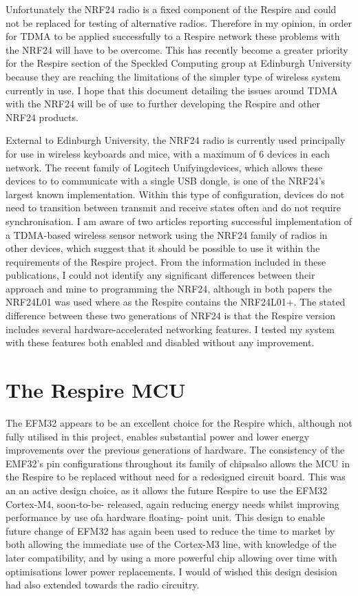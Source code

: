 Unfortunately the \ac{NRF24} radio is a fixed component of the Respire and could
not be replaced for testing of alternative radios. Therefore in my opinion, in order
for \ac{TDMA} to be applied successfully to a Respire network these problems with
the \ac{NRF24} will have to be overcome. This has recently become a greater priority
for the Respire section of the Speckled Computing group at Edinburgh University
because they are reaching the limitations of the simpler type of wireless system
currently in use.  I hope that this document detailing the issues around \ac{TDMA}
with the \ac{NRF24} will be of use to further developing the Respire and other
\ac{NRF24} products.

External to Edinburgh University, the \ac{NRF24} radio is currently used principally for use in wireless
keyboards and mice, with a maximum of 6 devices in each network. The recent family of Logitech
Unifying\textregistered devices, which allows these devices to to communicate with a single \ac{USB}
dongle, is one of the \ac{NRF24}'s largest known implementation. Within this type of configuration, devices do not need
to transition between transmit and receive states often and do not require synchronisation. I am
aware of two articles reporting successful implementation of a TDMA-based wireless sensor network
using the \ac{NRF24} family of radios \cite{GossipingMAC, DecentralizedTDMA} in other devices, which suggest that it should be possible to
use it within the requirements of the Respire project. From the information included in these
publications, I could not identify any significant differences between their approach and mine to
programming the \ac{NRF24}, although in both papers the NRF24L01 was used where as the Respire
contains the NRF24L01+. The stated difference between these two generations of \ac{NRF24} is that the
Respire version includes several hardware-accelerated networking features. I tested my system with
these features both enabled and disabled without any improvement.

\section{The Respire MCU}
The EFM32 appears to be an excellent choice for the Respire which, although not fully utilised in this
project, enables substantial power and lower energy improvements over the previous generations of
hardware. The consistency of the EMF32's pin configurations throughout its family of chipsalso
allows the MCU in the Respire to be replaced without need for a redesigned circuit board. This was
an an active design choice, as it allows the future Respire to use the EFM32 Cortex-M4, soon-to-be-
released, again reducing energy needs whilst improving performance by use ofa hardware floating-
point unit. This design to enable future change of EFM32 has again been used to reduce the time to
market by both allowing the immediate use of the Cortex-M3 line, with knowledge of the later
compatibility, and by using a more powerful chip allowing over time with optimisations lower power
replacements. I would of wished this design desision had also extended towards the radio circuitry.

